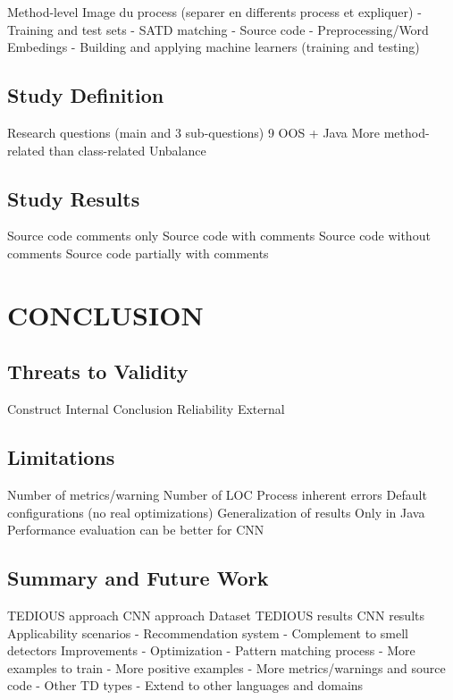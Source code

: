 \documentclass{beamer}
\begin{document}
		Method-level
		Image du process (separer en differents process et expliquer)
		- Training and test sets
		- SATD matching
		- Source code
		- Preprocessing/Word Embedings
		- Building and applying machine learners (training and testing)

		\subsection{Study Definition}	
		
		Research questions (main and 3 sub-questions)
		9 OOS + Java
		More method-related than class-related
		Unbalance

		\subsection{Study Results}
		
		Source code comments only
		Source code with comments
		Source code without comments
		Source code partially with comments
			
	\section{CONCLUSION}
	
		\subsection{Threats to Validity}
		
		Construct
		Internal
		Conclusion
		Reliability
		External

		\subsection{Limitations}	
		
		Number of metrics/warning
		Number of LOC
		Process inherent errors
		Default configurations (no real optimizations)
		Generalization of results
		Only in Java
		Performance evaluation can be better for CNN
		
		\subsection{Summary and Future Work}	
	
		TEDIOUS approach
		CNN approach
		Dataset
		TEDIOUS results
		CNN results
		Applicability scenarios
			- Recommendation system
			- Complement to smell detectors
		Improvements
			- Optimization
			- Pattern matching process
			- More examples to train
			- More positive examples
			- More metrics/warnings and source code
			- Other TD types
			- Extend to other languages and domains
			
\end{document}
